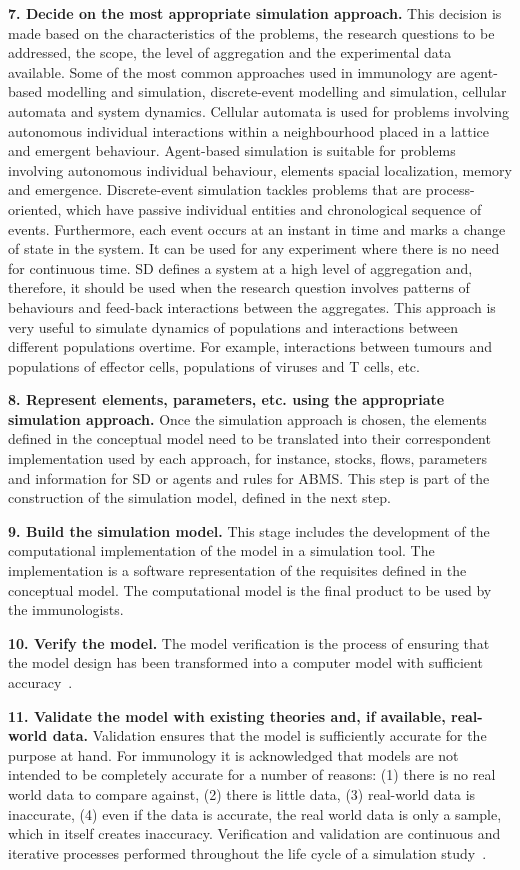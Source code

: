 \documentclass{llncs}
\begin{document}
{\bf 7. Decide on the most appropriate simulation approach.} This decision is made based on the characteristics of the problems, the research questions to be addressed, the scope, the level of aggregation and the experimental data available. Some of the most common approaches used in immunology are agent-based modelling and simulation, discrete-event modelling and simulation, cellular automata and system dynamics. Cellular automata is used for problems involving autonomous individual interactions within a neighbourhood placed in a lattice and emergent behaviour. Agent-based simulation is suitable for problems involving autonomous individual behaviour, elements spacial localization, memory and emergence. Discrete-event simulation tackles problems that are process-oriented, which have passive individual entities and chronological sequence of events. Furthermore, each event occurs at an instant in time and marks a change of state in the system. It can be used for any experiment where there is no need for continuous time. SD defines a system at a high level of aggregation and, therefore, it should be used when the research question involves patterns of behaviours and feed-back interactions between the aggregates. This approach is very useful to simulate dynamics of populations and interactions between different populations overtime. For example, interactions between tumours and populations of effector cells, populations of viruses and T cells, etc.

{\bf 8. Represent elements, parameters, etc. using the appropriate simulation approach.} Once the simulation approach is chosen, the elements defined in the conceptual model need to be translated into their correspondent implementation used by each approach, for instance, stocks, flows, parameters and information for SD or agents and rules for ABMS. This step is part of the construction of the simulation model, defined in the next step.

{\bf 9. Build the simulation model.} This stage includes the development of the computational implementation of the model in a simulation tool. The implementation is a software representation of the requisites defined in the conceptual model. The computational model is the final product to be used by the immunologists.

{\bf 10. Verify the model.} The model verification is the process of ensuring that the model design has been transformed into a computer model with sufficient accuracy~\cite{Robinson:2004}.

{\bf 11. Validate the model with existing theories and, if available, real-world data.} Validation ensures that the model is sufficiently accurate for the purpose at hand. For immunology it is acknowledged that models are not intended to be completely accurate for a number of reasons: (1) there is no real world data to compare against, (2) there is little data, (3) real-world data is inaccurate, (4) even if the data is accurate, the real world data is only a sample, which in itself creates inaccuracy. Verification and validation are continuous and iterative processes performed throughout the life cycle of a simulation study~\cite{Robinson:2004}.
\end{document}
